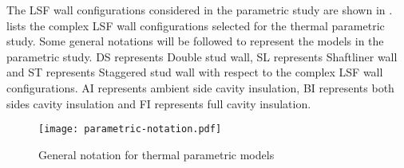 The LSF wall configurations considered in the parametric study are shown in .  lists the complex LSF wall configurations selected for the thermal parametric study. Some general notations will be followed to represent the models in the parametric study. DS represents Double stud wall, SL represents Shaftliner wall and ST represents Staggered stud wall with respect to the complex LSF wall configurations. AI represents ambient side cavity insulation, BI represents both sides cavity insulation and FI represents full cavity insulation.    
\begin{figure}[!htbp]
	\centering
	\texttt{[image: parametric-notation.pdf]}
	\caption{General notation for thermal parametric models}
	\label{parametric-notation}
\end{figure}
